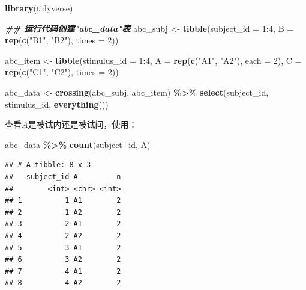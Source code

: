 \documentclass[
]{book}
\newenvironment{Shaded}{\begin{snugshade}}{\end{snugshade}}
\newcommand{\AttributeTok}[1]{\textcolor[rgb]{0.13,0.29,0.53}{#1}}
\newcommand{\DecValTok}[1]{\textcolor[rgb]{0.00,0.00,0.81}{#1}}
\newcommand{\DocumentationTok}[1]{\textcolor[rgb]{0.56,0.35,0.01}{\textbf{\textit{#1}}}}
\newcommand{\FunctionTok}[1]{\textcolor[rgb]{0.13,0.29,0.53}{\textbf{#1}}}
\newcommand{\NormalTok}[1]{#1}
\newcommand{\OtherTok}[1]{\textcolor[rgb]{0.56,0.35,0.01}{#1}}
\newcommand{\SpecialCharTok}[1]{\textcolor[rgb]{0.81,0.36,0.00}{\textbf{#1}}}
\newcommand{\StringTok}[1]{\textcolor[rgb]{0.31,0.60,0.02}{#1}}
\begin{document}
\begin{Shaded}
\begin{Highlighting}[]
\FunctionTok{library}\NormalTok{(tidyverse)}

\DocumentationTok{\#\# 运行代码创建"abc\_data"表}
\NormalTok{abc\_subj }\OtherTok{\textless{}{-}} \FunctionTok{tibble}\NormalTok{(}\AttributeTok{subject\_id =} \DecValTok{1}\SpecialCharTok{:}\DecValTok{4}\NormalTok{,}
                   \AttributeTok{B =} \FunctionTok{rep}\NormalTok{(}\FunctionTok{c}\NormalTok{(}\StringTok{"B1"}\NormalTok{, }\StringTok{"B2"}\NormalTok{), }\AttributeTok{times =} \DecValTok{2}\NormalTok{))}

\NormalTok{abc\_item  }\OtherTok{\textless{}{-}} \FunctionTok{tibble}\NormalTok{(}\AttributeTok{stimulus\_id =} \DecValTok{1}\SpecialCharTok{:}\DecValTok{4}\NormalTok{,}
                    \AttributeTok{A =} \FunctionTok{rep}\NormalTok{(}\FunctionTok{c}\NormalTok{(}\StringTok{"A1"}\NormalTok{, }\StringTok{"A2"}\NormalTok{), }\AttributeTok{each =} \DecValTok{2}\NormalTok{),}
                    \AttributeTok{C =} \FunctionTok{rep}\NormalTok{(}\FunctionTok{c}\NormalTok{(}\StringTok{"C1"}\NormalTok{, }\StringTok{"C2"}\NormalTok{), }\AttributeTok{times =} \DecValTok{2}\NormalTok{))}

\NormalTok{abc\_data }\OtherTok{\textless{}{-}} \FunctionTok{crossing}\NormalTok{(abc\_subj, abc\_item) }\SpecialCharTok{\%\textgreater{}\%}
  \FunctionTok{select}\NormalTok{(subject\_id, stimulus\_id, }\FunctionTok{everything}\NormalTok{())}
\end{Highlighting}
\end{Shaded}

查看\(A\)是被试内还是被试间，使用：

\begin{Shaded}
\begin{Highlighting}[]
\NormalTok{abc\_data }\SpecialCharTok{\%\textgreater{}\%}
  \FunctionTok{count}\NormalTok{(subject\_id, A)}
\end{Highlighting}
\end{Shaded}

\begin{verbatim}
## # A tibble: 8 x 3
##   subject_id A         n
##        <int> <chr> <int>
## 1          1 A1        2
## 2          1 A2        2
## 3          2 A1        2
## 4          2 A2        2
## 5          3 A1        2
## 6          3 A2        2
## 7          4 A1        2
## 8          4 A2        2
\end{verbatim}
\end{document}
